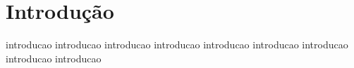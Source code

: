 \chapter*{Introdu\c c\~ao}
introducao introducao introducao
introducao introducao introducao
introducao introducao introducao

